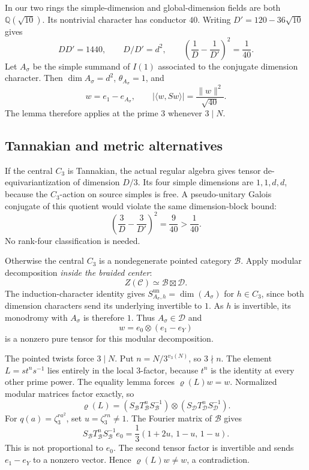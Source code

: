 \documentclass[11pt]{article}
\newcommand{\Q}{\mathbb Q}
\begin{document}
In our two rings the simple-dimension and global-dimension fields are
both $\Q(\sqrt{10})$. Its nontrivial character has conductor $40$.
Writing $D'=120-36\sqrt{10}$ gives
\[
 DD'=1440,\qquad D/D'=d^2,\qquad
 \left(\frac1D-\frac1{D'}\right)^2=\frac1{40}.
\]
Let $A_\sigma$ be the simple summand of $I(1)$ associated to the
conjugate dimension character. Then $\dim A_\sigma=d^2$,
$\theta_{A_\sigma}=1$, and
\[
 w=e_1-e_{A_\sigma},\qquad
 |\langle w,Sw\rangle|=\frac{\|w\|^2}{\sqrt{40}}.
\]
The lemma therefore applies at the prime $3$ whenever $3\mid N$.

\subsection{Tannakian and metric alternatives}
If the central $C_3$ is Tannakian, the actual regular algebra gives
tensor de-equivariantization of dimension $D/3$. Its four simple
dimensions are $1,1,d,d$, because the $C_3$-action on source simples is
free. A pseudo-unitary Galois conjugate of this quotient would violate
the same dimension-block bound:
\[
 \left(\frac3D-\frac3{D'}\right)^2
 =\frac9{40}>\frac1{40}.
\]
No rank-four classification is needed.

Otherwise the central $C_3$ is a nondegenerate pointed category
$\mathcal B$. Apply modular decomposition \emph{inside the braided
center}:
\[
 Z(\mathcal C)\simeq\mathcal B\boxtimes\mathcal D.
\]
The induction-character identity gives
$S^{\mathrm{un}}_{A_\sigma,h}=\dim(A_\sigma)$ for $h\in C_3$,
since both dimension characters send its underlying invertible to $1$.
As $h$ is invertible, its monodromy with $A_\sigma$ is therefore $1$.
Thus $A_\sigma\in\mathcal D$ and
\[
 w=e_0\otimes(e_1-e_Y)
\]
is a nonzero pure tensor for this modular decomposition.

The pointed twists force $3\mid N$. Put $n=N/3^{v_3(N)}$, so
$3\nmid n$. The element $L=st^ns^{-1}$ lies entirely in the local
$3$-factor, because $t^n$ is the identity at every other prime power.
The equality lemma forces $\varrho(L)w=w$.
Normalized modular matrices factor exactly, so
\[
 \varrho(L)=(S_{\mathcal B}T_{\mathcal B}^nS_{\mathcal B}^{-1})
 \otimes(S_{\mathcal D}T_{\mathcal D}^nS_{\mathcal D}^{-1}).
\]
For $q(a)=\zeta_3^{ra^2}$, set $u=\zeta_3^{rn}\ne1$.
The Fourier matrix of $\mathcal B$ gives
\[
 S_{\mathcal B}T_{\mathcal B}^nS_{\mathcal B}^{-1}e_0
 =\frac13(1+2u,\,1-u,\,1-u).
\]
This is not proportional to $e_0$. The second tensor factor is
invertible and sends $e_1-e_Y$ to a nonzero vector. Hence
$\varrho(L)w\ne w$, a contradiction.
\end{document}
